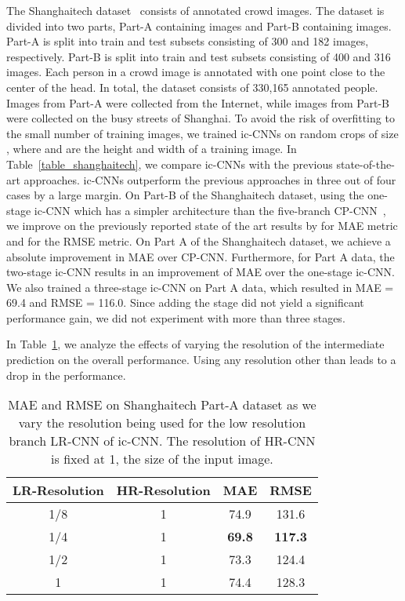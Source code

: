 \documentclass[runningheads]{llncs}
\begin{document}
The Shanghaitech dataset~\cite{zhang2016single} consists of
 annotated crowd images. The dataset is divided into two parts, Part-A containing  images and Part-B containing  images. Part-A is split into train and test subsets consisting of 300 and 182 images,  respectively. Part-B is split into train and test subsets consisting of 400 and 316 images. Each person in a crowd image is annotated with one point close to the center of the head. In total, the dataset consists of 330,165 annotated people. Images from Part-A were collected from the Internet, while images from Part-B were collected on the busy streets of Shanghai. To avoid the risk of overfitting to the small number of training images, we trained ic-CNNs on random crops of size , where  and  are the height and width of a training image. In Table~\ref{table_shanghaitech}, we compare ic-CNNs with the previous state-of-the-art approaches. ic-CNNs outperform the previous approaches in three out of four cases by a large margin. On Part-B of the Shanghaitech dataset, using the one-stage ic-CNN which has a simpler architecture than the five-branch CP-CNN~\cite{sindagi2017generating}, we improve on the previously reported state of the art results by  for MAE metric and  for the RMSE metric. On Part A of the Shanghaitech dataset, we achieve a  absolute improvement in MAE over CP-CNN. Furthermore, for Part A data, the two-stage ic-CNN results in an improvement of  MAE over the one-stage ic-CNN. We also trained a three-stage ic-CNN on Part A data,  which resulted in MAE = 69.4 and RMSE = 116.0. Since adding the  stage did not yield a significant performance gain, we did not experiment with more than three stages.


In Table~\ref{tab:Rebuttal-resolution}, we analyze the effects of varying the resolution of the intermediate prediction on the overall performance. Using any resolution other than  leads to a drop in the performance.


\begin{table}[!t]
\centering
   \caption{MAE and RMSE on Shanghaitech Part-A dataset as we vary the resolution being used for the low resolution branch LR-CNN of ic-CNN. The resolution of HR-CNN is fixed at 1, the size of the input image.\label{tab:Rebuttal-resolution} }
\begin{tabular}{cccc}
\toprule
LR-Resolution & HR-Resolution & MAE & RMSE \\
\midrule
1/8   &  1  &  74.9   &    131.6 \\ 
1/4  & 1   &  \textbf{69.8}   &   \textbf{117.3}  \\  
1/2  & 1   &  73.3  &  124.4  \\ 
1   &  1  &   74.4  &  128.3   \\    \bottomrule
   \end{tabular}
\end{table}
\end{document}
